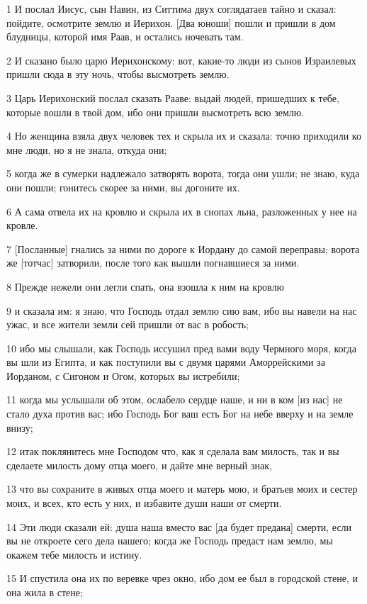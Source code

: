 \par 1 И послал Иисус, сын Навин, из Ситтима двух соглядатаев тайно и сказал: пойдите, осмотрите землю и Иерихон. [Два юноши] пошли и пришли в дом блудницы, которой имя Раав, и остались ночевать там.
\par 2 И сказано было царю Иерихонскому: вот, какие-то люди из сынов Израилевых пришли сюда в эту ночь, чтобы высмотреть землю.
\par 3 Царь Иерихонский послал сказать Рааве: выдай людей, пришедших к тебе, которые вошли в твой дом, ибо они пришли высмотреть всю землю.
\par 4 Но женщина взяла двух человек тех и скрыла их и сказала: точно приходили ко мне люди, но я не знала, откуда они;
\par 5 когда же в сумерки надлежало затворять ворота, тогда они ушли; не знаю, куда они пошли; гонитесь скорее за ними, вы догоните их.
\par 6 А сама отвела их на кровлю и скрыла их в снопах льна, разложенных у нее на кровле.
\par 7 [Посланные] гнались за ними по дороге к Иордану до самой переправы; ворота же [тотчас] затворили, после того как вышли погнавшиеся за ними.
\par 8 Прежде нежели они легли спать, она взошла к ним на кровлю
\par 9 и сказала им: я знаю, что Господь отдал землю сию вам, ибо вы навели на нас ужас, и все жители земли сей пришли от вас в робость;
\par 10 ибо мы слышали, как Господь иссушил пред вами воду Чермного моря, когда вы шли из Египта, и как поступили вы с двумя царями Аморрейскими за Иорданом, с Сигоном и Огом, которых вы истребили;
\par 11 когда мы услышали об этом, ослабело сердце наше, и ни в ком [из нас] не стало духа против вас; ибо Господь Бог ваш есть Бог на небе вверху и на земле внизу;
\par 12 итак поклянитесь мне Господом что, как я сделала вам милость, так и вы сделаете милость дому отца моего, и дайте мне верный знак,
\par 13 что вы сохраните в живых отца моего и матерь мою, и братьев моих и сестер моих, и всех, кто есть у них, и избавите души наши от смерти.
\par 14 Эти люди сказали ей: душа наша вместо вас [да будет предана] смерти, если вы не откроете сего дела нашего; когда же Господь предаст нам землю, мы окажем тебе милость и истину.
\par 15 И спустила она их по веревке чрез окно, ибо дом ее был в городской стене, и она жила в стене;
